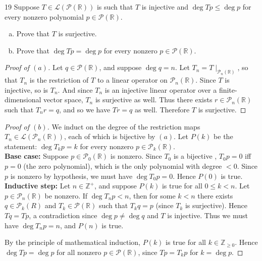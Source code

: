 \documentclass[11pt]{extarticle}
\newenvironment{problem}[1]{\begin{prob*}{#1}{}}{\end{prob*}}
\newcommand{\Z}{\mathbb{Z}}
\newcommand{\R}{\mathbb{R}}
\newcommand{\poly}{\mathcal{P}}
\newcommand{\Hom}{\mathcal{L}}
\begin{document}
\begin{problem}{19}
Suppose $T\in\Hom(\poly(\R))$ is such that $T$ is injective and $\deg Tp\leq \deg p$ for every nonzero polynomial $p\in\poly(\R)$.
\begin{enumerate}[(a)]
\item Prove that $T$ is surjective.
\item Prove that $\deg Tp = \deg p$ for every nonzero $p\in\poly(\R)$.  
\end{enumerate}
\end{problem}
\begin{proof}[Proof of $(a)$]
Let $q\in\poly(\R)$, and suppose $\deg q = n$.  Let $T_n = T\mid_{\poly_n(\R)}$, so that $T_n$ is the restriction of $T$ to a linear operator on $\poly_n(\R)$.  Since $T$ is injective, so is $T_n$.  And since $T_n$ is an injective linear operator over a finite-dimensional vector space, $T_n$ is surjective as well.  Thus there exists $r\in\poly_n(\R)$ such that $T_nr = q$, and so we have $Tr = q$ as well.  Therefore $T$ is surjective.
\end{proof}
\begin{proof}[Proof of $(b)$]
We induct on the degree of the restriction maps $T_n\in\Hom(\poly_n(\R))$, each of which is bijective by $(a)$.  Let $P(k)$ be the statement: $\deg T_k p = k$ for every nonzero $p\in\poly_k(\R)$.\\
\textbf{Base case:} Suppose $p\in\poly_0(\R)$ is nonzero.  Since $T_0$ is a bijective , $T_0p = 0$ iff $p = 0$ (the zero polynomial), which is the only polynomial with degree $< 0$.  Since $p$ is nonzero by hypothesis, we must have $\deg T_0p = 0$.  Hence $P(0)$ is true.\\
\textbf{Inductive step:} Let $n\in\Z^+$, and suppose $P(k)$ is true for all $0\leq k < n$.  Let $p\in\poly_{n}(\R)$ be nonzero.  If $\deg T_{n}p < n$, then for some $k < n$ there exists $q\in\poly_k(R)$ and $T_k\in\poly(\R)$ such that $T_kq = p$ (since $T_k$ is surjective).  Hence $Tq = Tp$, a contradiction since $\deg p\neq \deg q$ and $T$ is injective.  Thus we must have $\deg T_{n}p = n$, and $P(n)$ is true.
\par By the principle of mathematical induction, $P(k)$ is true for all $k\in\Z_{\geq 0}$.  Hence $\deg Tp = \deg p$ for all nonzero $p\in\poly(\R)$, since $Tp = T_k p$ for $k = \deg p$.
\end{proof}

\end{document}
